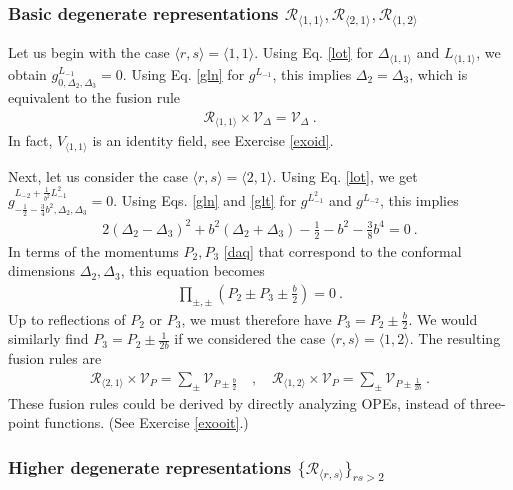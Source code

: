 \documentclass[12pt, a4paper, notitlepage, twoside]{report}
\numberwithin{equation}{section}
\theoremstyle{break}
\begin{document}
\subsubsection{Basic degenerate representations $\mathcal{R}_{\langle 1,1 \rangle}, \mathcal{R}_{\langle 2,1 \rangle}, \mathcal{R}_{\langle 1,2 \rangle}$}

Let us begin with the case $\langle r,s \rangle = \langle 1,1 \rangle$.
Using Eq. \eqref{lot} for $\Delta_{\langle 1,1 \rangle}$ and $L_{\langle 1,1 \rangle}$, we obtain
$g^{L_{-1}}_{0,\Delta_2,\Delta_3} = 0$.
Using Eq. \eqref{gln} for $g^{L_{-1}}$, this implies 
$
 \Delta_2=\Delta_3
$,
which is equivalent to the fusion rule
\begin{align}
 \boxed{\mathcal{R}_{\langle 1,1\rangle} \times \mathcal{V}_\Delta = \mathcal{V}_\Delta} \ .
 \label{roof}
\end{align}
In fact, $V_{\langle 1,1\rangle}$ is an identity field, see Exercise \ref{exoid}.

Next, let us consider the case $\langle r,s \rangle = \langle 2,1 \rangle$.
Using Eq. \eqref{lot}, we get
$g^{L_{-2} +\frac{1}{b^2} L_{-1}^2 }_{-\frac12 -\frac34 b^2,\Delta_2,\Delta_3} = 0$.
Using Eqs. \eqref{gln} and \eqref{glt} for $g^{L_{-1}^2}$ and $g^{L_{-2}}$, this implies
\begin{align}
 2(\Delta_2-\Delta_3)^2 + b^2 (\Delta_2+\Delta_3) - \frac12 - b^2 -\frac38 b^4= 0\ .
\end{align}
In terms of the momentums $P_2,P_3$ \eqref{daq} that correspond to the conformal dimensions $\Delta_2,\Delta_3$, this equation becomes
\begin{align}
\prod_{\pm,\pm} \left(P_2\pm P_3 \pm \frac{b}{2}\right) = 0 \ .
\end{align}
Up to reflections of $P_2$ or $P_3$, we must therefore have
$
 P_3 = P_2 \pm \frac{b}{2}
$.
We would similarly find $P_3 = P_2 \pm \frac{1}{2b}$ if we considered the case $\langle r,s\rangle = \langle 1,2\rangle$. 
The resulting fusion rules are 
\begin{align}
\boxed{ \mathcal{R}_{\langle 2,1 \rangle}\times \mathcal{V}_P = \sum_\pm \mathcal{V}_{P \pm \frac{b}{2}} }\quad , \quad 
\boxed{ \mathcal{R}_{\langle 1,2 \rangle}\times \mathcal{V}_P = \sum_\pm \mathcal{V}_{P \pm \frac{1}{2b}} }\ .
\label{rot}
\end{align}
These fusion rules could be derived by directly analyzing OPEs, instead of three-point functions. (See Exercise \ref{exooit}.) 

\subsubsection{Higher degenerate representations $\{\mathcal{R}_{\langle r,s\rangle}\}_{rs>2}$}
\end{document}
